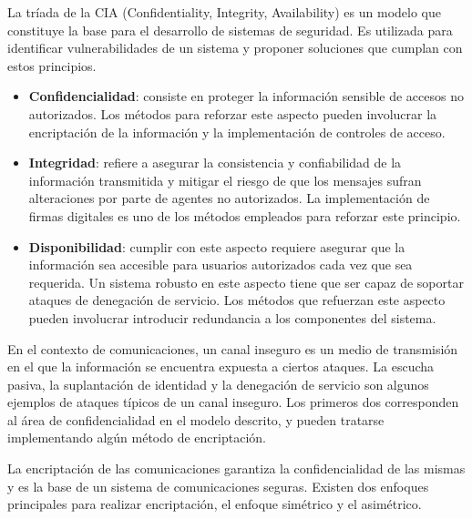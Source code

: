 \documentclass[12pt]{article}
\begin{document}
La tríada de la CIA (Confidentiality, Integrity, Availability) es un modelo que constituye la base para el desarrollo de sistemas de seguridad. Es utilizada para identificar vulnerabilidades de un sistema y proponer soluciones que cumplan con estos principios. 
\begin{itemize}
    \item \textbf{Confidencialidad}: consiste en proteger la información sensible de accesos no autorizados. Los métodos para reforzar este aspecto pueden involucrar la encriptación de la información y la implementación de controles de acceso.
    \item \textbf{Integridad}: refiere a asegurar la consistencia y confiabilidad de la información transmitida y mitigar el riesgo de que los mensajes sufran alteraciones por parte de agentes no autorizados. La implementación de firmas digitales es uno de los métodos empleados para reforzar este principio.
    \item \textbf{Disponibilidad}: cumplir con este aspecto requiere asegurar que la información sea accesible para usuarios autorizados cada vez que sea requerida. Un sistema robusto en este aspecto tiene que ser capaz de soportar ataques de denegación de servicio. Los métodos que refuerzan este aspecto pueden involucrar introducir redundancia a los componentes del sistema.
\end{itemize}

En el contexto de comunicaciones, un canal inseguro es un medio de transmisión en el que la información se encuentra expuesta a ciertos ataques. La escucha pasiva, la suplantación de identidad y la denegación de servicio son algunos ejemplos de ataques típicos de un canal inseguro. Los primeros dos corresponden al área de confidencialidad en el modelo descrito, y pueden tratarse implementando algún método de encriptación.

La encriptación de las comunicaciones garantiza la confidencialidad de las mismas y es la base de un sistema de comunicaciones seguras. Existen dos enfoques principales para realizar encriptación, el enfoque simétrico y el asimétrico.

\newpage
\end{document}

